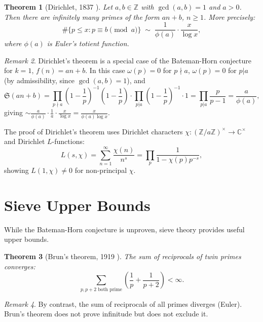 \documentclass[12pt,a4paper]{amsart}
\newtheorem{theorem}{Theorem}[section]
\theoremstyle{definition}
\theoremstyle{remark}
\newtheorem{remark}[theorem]{Remark}
\newcommand{\Z}{\mathbb{Z}}
\newcommand{\C}{\mathbb{C}}
\newcommand{\BH}{\mathfrak{S}}
\begin{document}
\begin{theorem}[Dirichlet, 1837 \cite{Dirichlet1837}]\label{thm:dirichlet}
  Let $a, b \in \Z$ with $\gcd(a,b) = 1$ and $a > 0$. Then there are infinitely many
  primes of the form $an + b$, $n \geq 1$.
  More precisely:
  \[
    \#\{p \leq x : p \equiv b \pmod{a}\} \;\sim\; \frac{1}{\phi(a)} \cdot \frac{x}{\log x},
  \]
  where $\phi(a)$ is Euler's totient function.
\end{theorem}

\begin{remark}
  Dirichlet's theorem is a special case of the Bateman-Horn conjecture for $k=1$,
  $f(n) = an+b$. In this case $\omega(p) = 0$ for $p \nmid a$, $\omega(p) = 0$ for $p|a$
  (by admissibility, since $\gcd(a,b) = 1$), and
  \[
    \BH(an+b) = \prod_{p\nmid a} \left(1-\frac{1}{p}\right)^{-1}\left(1-\frac{1}{p}\right)
              \cdot \prod_{p|a} \left(1-\frac{1}{p}\right)^{-1} \cdot 1
              = \prod_{p|a} \frac{p}{p-1}
              = \frac{a}{\phi(a)},
  \]
  giving $\sim \frac{a}{\phi(a)} \cdot \frac{1}{a} \cdot \frac{x}{\log x} = \frac{x}{\phi(a)\log x}$.
\end{remark}

The proof of Dirichlet's theorem uses Dirichlet characters $\chi\colon (\Z/a\Z)^\times \to \C^\times$
and Dirichlet $L$-functions:
\begin{equation}
  L(s, \chi) = \sum_{n=1}^\infty \frac{\chi(n)}{n^s} = \prod_p \frac{1}{1-\chi(p)p^{-s}},
\end{equation}
showing $L(1, \chi) \neq 0$ for non-principal $\chi$.

\section{Sieve Upper Bounds}\label{sec:sieve}

While the Bateman-Horn conjecture is unproven, sieve theory provides useful upper bounds.

\begin{theorem}[Brun's theorem, 1919 \cite{Brun1919}]
  The sum of reciprocals of twin primes converges:
  \[
    \sum_{p,p+2 \text{ both prime}} \left(\frac{1}{p} + \frac{1}{p+2}\right) < \infty.
  \]
\end{theorem}

\begin{remark}
  By contrast, the sum of reciprocals of all primes diverges (Euler). Brun's theorem
  does not prove infinitude but does not exclude it.
\end{remark}
\end{document}
